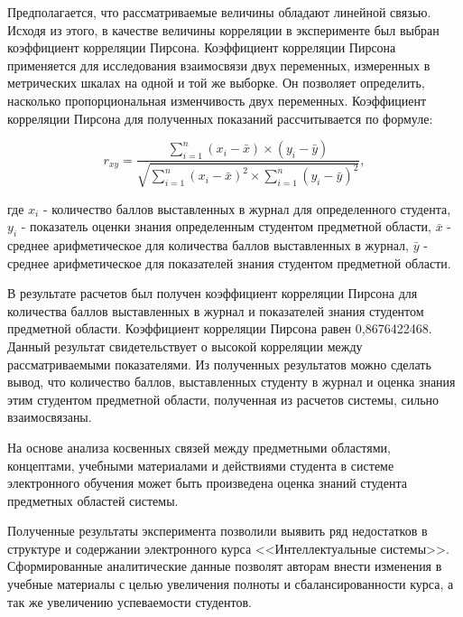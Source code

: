 Предполагается, что рассматриваемые величины обладают линейной связью. Исходя из этого, в качестве величины корреляции в эксперименте был выбран коэффициент корреляции Пирсона. Коэффициент корреляции Пирсона применяется для исследования взаимосвязи двух переменных, измеренных в метрических шкалах на одной и той же выборке. Он позволяет определить, насколько пропорциональная изменчивость двух переменных. Коэффициент корреляции Пирсона для полученных показаний  рассчитывается по формуле:

$$
    r_{xy} =  \frac{\sum_{i=1}^{n} (x_i - \bar x) \times (y_i - \bar y)}{ \sqrt{\sum_{i=1}^{n}(x_i - \bar x)^2 \times \sum_{i=1}^{n}(y_i - \bar y)^2}},
$$

где \(x_i\) - количество баллов выставленных в журнал для определенного студента, \(y_i\) - показатель оценки знания определенным студентом предметной области, \(\bar x\) - среднее арифметическое для количества баллов выставленных в журнал, \(\bar y\) - среднее арифметическое для показателей знания студентом предметной области. 

В результате расчетов был получен коэффициент корреляции Пирсона для количества баллов выставленных в журнал и показателей знания студентом предметной области. Коэффициент корреляции Пирсона равен 0,8676422468. Данный результат свидетельствует о высокой корреляции между рассматриваемыми показателями. Из полученных результатов можно сделать вывод, что количество баллов, выставленных студенту в журнал и оценка знания этим студентом предметной области, полученная из расчетов системы, сильно взаимосвязаны. 

На основе анализа косвенных связей между предметными областями, концептами, учебными материалами и действиями студента в системе электронного обучения может быть произведена оценка знаний студента предметных областей системы.  

Полученные результаты эксперимента позволили выявить ряд недостатков в структуре и содержании электронного курса <<Интеллектуальные системы>>. Сформированные аналитические данные позволят авторам внести изменения в учебные материалы с целью увеличения полноты и сбалансированности курса, а так же увеличению успеваемости студентов.

\clearpage
